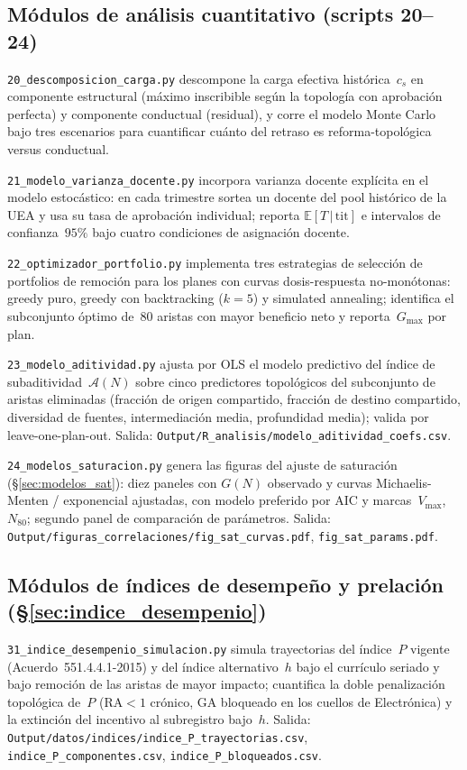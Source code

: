\documentclass[11pt,letterpaper]{article}
\newcommand{\ETtit}{\mathbb{E}[T\,|\,\mathrm{tit}]}
\begin{document}
\begin{sloppypar}
\subsection{Módulos de análisis cuantitativo (scripts 20--24)}

\texttt{20\_descomposicion\_carga.py}
descompone la carga efectiva histórica~$c_s$ en componente estructural
(máximo inscribible según la topología con aprobación perfecta) y componente
conductual (residual), y corre el modelo Monte Carlo bajo tres escenarios
para cuantificar cuánto del retraso es reforma-topológica versus conductual.

\texttt{21\_modelo\_varianza\_docente.py}
incorpora varianza docente explícita en el modelo estocástico: en cada
trimestre sortea un docente del pool histórico de la UEA y usa su tasa
de aprobación individual; reporta $\ETtit$ e intervalos de confianza~$95\%$
bajo cuatro condiciones de asignación docente.

\texttt{22\_optimizador\_portfolio.py}
implementa tres estrategias de selección de portfolios de remoción para los
planes con curvas dosis-respuesta no-monótonas: greedy puro, greedy con
backtracking ($k=5$) y simulated annealing; identifica el subconjunto óptimo
de~80 aristas con mayor beneficio neto y reporta~$G_{\max}$ por plan.

\texttt{23\_modelo\_aditividad.py}
ajusta por OLS el modelo predictivo del índice de subaditividad~$\mathcal{A}(N)$
sobre cinco predictores topológicos del subconjunto de aristas eliminadas
(fracción de origen compartido, fracción de destino compartido, diversidad de
fuentes, intermediación media, profundidad media); valida por leave-one-plan-out.
Salida: \texttt{Output/R\_analisis/modelo\_aditividad\_coefs.csv}.

\texttt{24\_modelos\_saturacion.py}
genera las figuras del ajuste de saturación (\S\ref{sec:modelos_sat}):
diez paneles con $G(N)$ observado y curvas Michaelis-Menten / exponencial
ajustadas, con modelo preferido por AIC y marcas~$V_{\max}$, $N_{80}$;
segundo panel de comparación de parámetros.
Salida: \texttt{Output/figuras\_correlaciones/fig\_sat\_curvas.pdf},
        \texttt{fig\_sat\_params.pdf}.

\subsection{Módulos de índices de desempeño y prelación (\S\ref{sec:indice_desempenio})}

\texttt{31\_indice\_desempenio\_simulacion.py}
simula trayectorias del índice~$P$ vigente (Acuerdo~551.4.4.1-2015) y del
índice alternativo~$h$ bajo el currículo seriado y bajo remoción de las
aristas de mayor impacto; cuantifica la doble penalización topológica de~$P$
($\mathrm{RA}<1$ crónico, $\mathrm{GA}$ bloqueado en los cuellos de Electrónica)
y la extinción del incentivo al subregistro bajo~$h$.
Salida: \texttt{Output/datos/indices/indice\_P\_trayectorias.csv},
        \texttt{indice\_P\_componentes.csv}, \texttt{indice\_P\_bloqueados.csv}.


\end{sloppypar}
\end{document}
